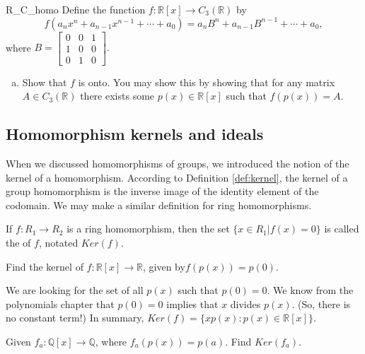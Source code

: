 \begin{exercise}{R_C_homo}
Define the function $f:{\mathbb R}[x]\rightarrow C_3({\mathbb R})$ by
\[f(a_nx^n+a_{n-1}x^{n-1}+\cdots +a_0)=a_nB^n+a_{n-1}B^{n-1}+\cdots +a_0,\] 
where $B=
\begin{bmatrix}
0 & 0 & 1\\
1 & 0 & 0\\
0 & 1 & 0
\end{bmatrix}.$

\begin{enumerate}[(a)]
\item Show that $f$ is onto.  You may show this by showing that for any matrix $A\in C_3({\mathbb R})$ there exists some $p(x)\in {\mathbb R}[x]$ such that $f(p(x))=A$.
\end{enumerate}
\end{exercise}



\subsection{Homomorphism kernels and ideals}

When we discussed homomorphisms of groups, we introduced the notion of the kernel of a homomorphism.  According to Definition \ref{def:kernel}, the kernel of a group homomorphism is the inverse image of the identity element of the codomain.  We may make a similar definition for ring homomorphisms.  

\begin{defn}\label{kernel}
If $f:R_1\rightarrow R_2$ is a ring homomorphism, then the set $\{x\in R_1|f(x)=0\}$ is called the  of $f$, notated $Ker(f)$.
\end{defn}

\begin{example}{}
Find the kernel of $f:{\mathbb R}[x]\rightarrow{\mathbb R}$, given by$f(p(x))=p(0)$.

We are looking for the set of all $p(x)$ such that $p(0)=0$. 
We know from the polynomials chapter that $p(0)=0$ implies that $x$ divides $p(x)$.  (So, there is no constant term!)  In summary, $Ker(f)=\{xp(x): p(x)\in{\mathbb R}[x]\}$.
\end{example}

\begin{exercise}{}
Given $f_a:{\mathbb Q}[x]\rightarrow{\mathbb Q}$, where $f_a(p(x))=p(a)$.  Find $Ker(f_a)$.
\end{exercise}

